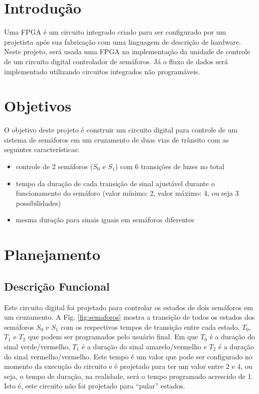 \documentclass[a4,12pt]{horizon-theme}
\begin{document}
\horizonCover

\horizonTitle


\section{Introdução}
Uma FPGA é um circuito integrado criado para ser configurado por um projetista após sua fabricação com uma linguagem de descrição de hardware. Neste projeto, será usada uma FPGA na implementação da unidade de controle de um circuito digital controlador de semáforos. Já o fluxo de dados será implementado utilizando circuitos integrados não programáveis.


\section{Objetivos}
O objetivo deste projeto é construir um circuito digital para controle de um sistema de semáforos em um cruzamento de duas vias de trânsito com as seguintes características:
\begin{itemize}
    \item controle de 2 semáforos ($S_0$ e $S_1$) com 6 transições de luzes no total
    \item tempo da duração de cada transição de sinal ajustável durante o funcionamento do semáforo (valor mínimo: 2, valor máximo: 4, ou seja 3 possibilidades)
    \item mesma duração para sinais iguais em semáforos diferentes
\end{itemize}

\section{Planejamento}
\subsection{Descrição Funcional}

Este circuito digital foi projetado para controlar os estados de dois semáforos em um cruzamento. A Fig. \ref{fig:semaforos} mostra a transição de todos os estados dos semáforos $S_0$ e $S_1$ com os respectivos tempos de transição entre cada estado, $T_0$, $T_1$ e $T_2$ que podem ser programados pelo usuário final. Em que $T_0$ é a duração do sinal verde/vermelho, $T_1$ é a duração do sinal amarelo/vermelho e $T_2$ é a duração do sinal vermelho/vermelho. Este tempo é um valor que pode ser configurado no momento da execução do circuito e é projetado para ter um valor entre 2 e 4, ou seja, o tempo de duração, na realidade, será o tempo programado acrescido de 1. Isto é, este circuito não foi projetado para ``pular'' estados.
\end{document}
